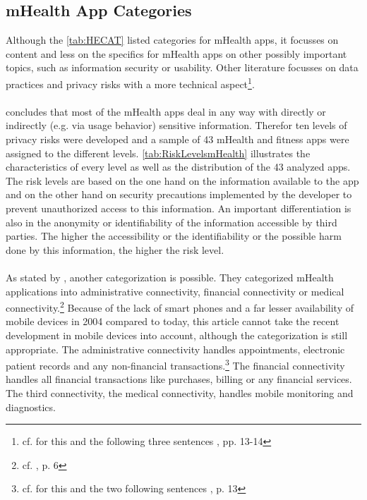 \subsection{mHealth App Categories}
Although the \ref{tab:HECAT} listed categories  for mHealth apps, it focusses on content and less on the specifics for mHealth apps on other possibly important topics, such as information security or usability. Other literature focusses on data practices and privacy risks with a more technical aspect\footnote{cf. for this and the following three sentences \cite{Njie.2013}, pp. 13-14}. 
\\
\\
\cite{Njie.2013} concludes that most of the mHealth apps deal in any way with directly or indirectly (e.g. via usage behavior) sensitive information. Therefor ten levels of privacy risks were developed and a sample of 43 mHealth and fitness apps were assigned to the different levels. \ref{tab:RiskLevelsmHealth} illustrates the characteristics of every level as well as the distribution of the 43 analyzed apps. 
\\
The risk levels are based on the one hand on the information available to the app and on the other hand on security precautions implemented by the developer to prevent unauthorized access to this information. An important differentiation is also in the anonymity or identifiability of the information accessible by third parties. The higher the accessibility or the identifiability or the possible harm done by this information, the higher the risk level.
\\
\\
As stated by \cite{Istepanian.2004}, another categorization is possible. They categorized mHealth applications into administrative connectivity, financial connectivity or medical connectivity.\footnote{cf. \cite{Istepanian.2004}, p. 6} Because of the lack of smart phones and a far lesser availability of mobile devices in 2004 compared to today, this article cannot take the recent development in mobile devices into account, although the categorization is still appropriate. The administrative connectivity handles appointments, electronic patient records and any non-financial transactions.\footnote{cf. for this and the two following sentences \cite{Istepanian.2004}, p. 13} The financial connectivity handles all financial transactions like purchases, billing or any financial services. The third connectivity, the medical connectivity, handles mobile monitoring and diagnostics.
\\
